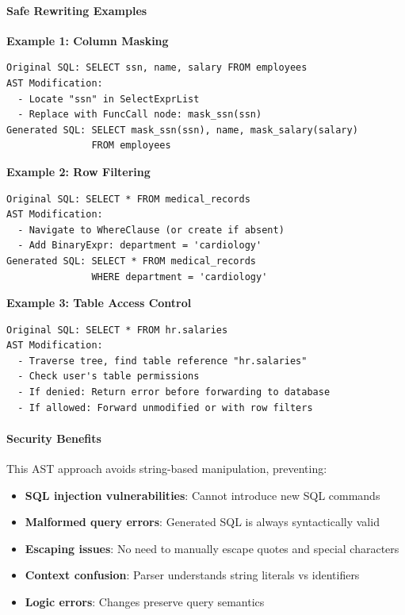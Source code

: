 \paragraph{Safe Rewriting Examples}

\textbf{Example 1: Column Masking}
\begin{verbatim}
Original SQL: SELECT ssn, name, salary FROM employees
AST Modification:
  - Locate "ssn" in SelectExprList
  - Replace with FuncCall node: mask_ssn(ssn)
Generated SQL: SELECT mask_ssn(ssn), name, mask_salary(salary) 
               FROM employees
\end{verbatim}

\textbf{Example 2: Row Filtering}
\begin{verbatim}
Original SQL: SELECT * FROM medical_records
AST Modification:
  - Navigate to WhereClause (or create if absent)
  - Add BinaryExpr: department = 'cardiology'
Generated SQL: SELECT * FROM medical_records 
               WHERE department = 'cardiology'
\end{verbatim}

\textbf{Example 3: Table Access Control}
\begin{verbatim}
Original SQL: SELECT * FROM hr.salaries
AST Modification:
  - Traverse tree, find table reference "hr.salaries"
  - Check user's table permissions
  - If denied: Return error before forwarding to database
  - If allowed: Forward unmodified or with row filters
\end{verbatim}

\paragraph{Security Benefits}

This AST approach avoids string-based manipulation, preventing:

\begin{itemize}
    \item \textbf{SQL injection vulnerabilities}: Cannot introduce new SQL commands
    \item \textbf{Malformed query errors}: Generated SQL is always syntactically valid
    \item \textbf{Escaping issues}: No need to manually escape quotes and special characters
    \item \textbf{Context confusion}: Parser understands string literals vs identifiers
    \item \textbf{Logic errors}: Changes preserve query semantics
\end{itemize}
